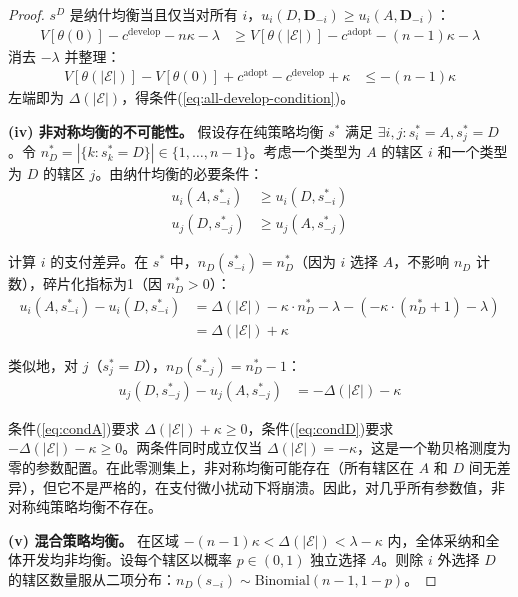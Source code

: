 \documentclass[12pt,a4paper]{ctexart}
\theoremstyle{definition}
\theoremstyle{remark}
\begin{document}
\begin{proof}
$s^{D}$ 是纳什均衡当且仅当对所有 $i$，$u_i(D, \mathbf{D}_{-i}) \geq u_i(A, \mathbf{D}_{-i})$：
\begin{align}
V[\theta(0)] - c^{\text{develop}} - n\kappa - \lambda &\geq V[\theta(|\mathcal{E}|)] - c^{\text{adopt}} - (n-1)\kappa - \lambda
\end{align}
消去 $-\lambda$ 并整理：
\begin{align}
V[\theta(|\mathcal{E}|)] - V[\theta(0)] + c^{\text{adopt}} - c^{\text{develop}} + \kappa &\leq -(n-1)\kappa
\end{align}
左端即为 $\Delta(|\mathcal{E}|)$，得条件(\ref{eq:all-develop-condition})。

\textbf{(iv) 非对称均衡的不可能性。} 假设存在纯策略均衡 $s^*$ 满足 $\exists i, j: s_i^* = A, s_j^* = D$。令 $n_D^* = |\{k: s_k^* = D\}| \in \{1, \ldots, n-1\}$。考虑一个类型为 $A$ 的辖区 $i$ 和一个类型为 $D$ 的辖区 $j$。由纳什均衡的必要条件：
\begin{align}
u_i(A, s_{-i}^*) &\geq u_i(D, s_{-i}^*) \label{eq:condA}\\
u_j(D, s_{-j}^*) &\geq u_j(A, s_{-j}^*) \label{eq:condD}
\end{align}

计算 $i$ 的支付差异。在 $s^*$ 中，$n_D(s_{-i}^*) = n_D^*$（因为 $i$ 选择 $A$，不影响 $n_D$ 计数），碎片化指标为1（因 $n_D^* > 0$）：
\begin{align}
u_i(A, s_{-i}^*) - u_i(D, s_{-i}^*) &= \Delta(|\mathcal{E}|) - \kappa \cdot n_D^* - \lambda - (-\kappa \cdot (n_D^* + 1) - \lambda) \nonumber\\
&= \Delta(|\mathcal{E}|) + \kappa
\end{align}

类似地，对 $j$（$s_j^* = D$），$n_D(s_{-j}^*) = n_D^* - 1$：
\begin{align}
u_j(D, s_{-j}^*) - u_j(A, s_{-j}^*) &= -\Delta(|\mathcal{E}|) - \kappa
\end{align}

条件(\ref{eq:condA})要求 $\Delta(|\mathcal{E}|) + \kappa \geq 0$，条件(\ref{eq:condD})要求 $-\Delta(|\mathcal{E}|) - \kappa \geq 0$。两条件同时成立仅当 $\Delta(|\mathcal{E}|) = -\kappa$，这是一个勒贝格测度为零的参数配置。在此零测集上，非对称均衡可能存在（所有辖区在 $A$ 和 $D$ 间无差异），但它不是严格的，在支付微小扰动下将崩溃。因此，对几乎所有参数值，非对称纯策略均衡不存在。

\textbf{(v) 混合策略均衡。} 在区域 $-(n-1)\kappa < \Delta(|\mathcal{E}|) < \lambda - \kappa$ 内，全体采纳和全体开发均非均衡。设每个辖区以概率 $p \in (0,1)$ 独立选择 $A$。则除 $i$ 外选择 $D$ 的辖区数量服从二项分布：$n_D(s_{-i}) \sim \text{Binomial}(n-1, 1-p)$。


\end{proof}
\end{document}
